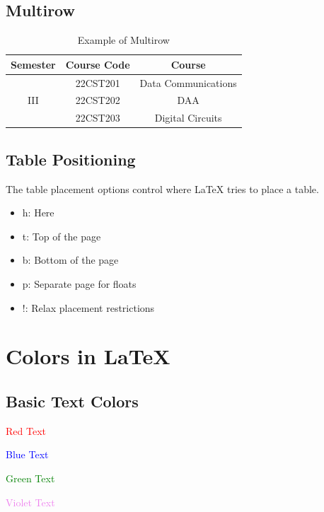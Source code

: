 \documentclass{article}
\begin{document}
\subsection{Multirow}

\begin{table}[h!]
    \centering
    \begin{tabular}{|c|c|c|}
        \hline
        \textbf{Semester} & \textbf{Course Code} & \textbf{Course} \\
        \hline
        \multirow{3}{*}{III}
        & 22CST201 & Data Communications \\
        \cline{2-3}
        & 22CST202 & DAA \\
        \cline{2-3}
        & 22CST203 & Digital Circuits \\
        \hline
    \end{tabular}
    \caption{Example of Multirow}
\end{table}

\subsection{Table Positioning}

The table placement options control where LaTeX tries to place a table.

\begin{itemize}
    \item h: Here
    \item t: Top of the page
    \item b: Bottom of the page
    \item p: Separate page for floats
    \item !: Relax placement restrictions
\end{itemize}

\section{Colors in LaTeX}

\subsection{Basic Text Colors}

\textcolor{red}{Red Text}

\textcolor{blue}{Blue Text}

\textcolor{green}{Green Text}

\textcolor{violet}{Violet Text}
\end{document}
